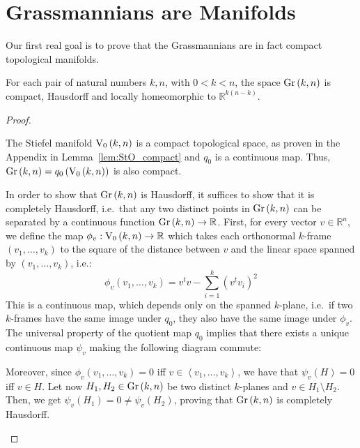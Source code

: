\section{Grassmannians are Manifolds}
Our first real goal is to prove that the Grassmannians are in fact compact topological manifolds.
\begin{lemma}\label{lem:gr_manifold} For each pair of natural numbers $k,n$, with $0<k<n$, the space $\Gr{k}{n}$ is compact, Hausdorff and locally homeomorphic to $\mathbb{R}^{k(n-k)}$.
\end{lemma}

\begin{proof} \begin{b_item}
\item The Stiefel manifold $\StO{k}{n}$ is a compact topological space, as proven in the Appendix in Lemma~\ref{lem:StO_compact} and $q_0$ is a continuous map. Thus, $\Gr{k}{n}=q_0\left(\StO{k}{n}\right)$ is also compact.
\item In order to show that $\Gr{k}{n}$ is Hausdorff, it suffices to show that it is completely Hausdorff, i.e.\ that any two distinct points in $\Gr{k}{n}$ can be separated by a continuous function $\Gr{k}{n}\to\mathbb{R}$. First, for every vector $v\in\mathbb{R}^n$, we define the map $\phi_v:\StO{k}{n}\to\mathbb{R}$ which takes each orthonormal $k$-frame $(v_1,\ldots,v_k)$ to the square of the distance between $v$ and the linear space spanned by $(v_1,\ldots,v_k)$, i.e.:
\[\phi_v(v_1,\ldots,v_k)=v^tv-\sum_{i=1}^k{\left(v^tv_i\right)}^2\]
This is a continuous map, which depends only on the spanned $k$-plane, i.e.\ if two $k$-frames have the same image under $q_0$, they also have the same image under $\phi_v$. The universal property of the quotient map $q_0$ implies that there exists a unique continuous map $\psi_v$ making the following diagram commute:

\begin{center}
\end{center}

Moreover, since $\phi_v(v_1,\ldots,v_k)=0$ iff $v\in\left<v_1,\ldots,v_k\right>$, we have that $\psi_v(H)=0$ iff $v\in H$. Let now $H_1,H_2\in\Gr{k}{n}$ be two distinct $k$-planes and $v\in H_1\setminus H_2$. Then, we get $\psi_v(H_1)=0\neq\psi_v(H_2)$, proving that $\Gr{k}{n}$ is completely Hausdorff.



\end{b_item}
\end{proof}
